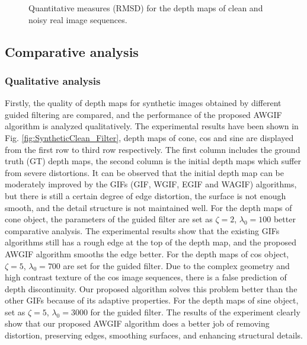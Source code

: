 \documentclass[a4paper,fleqn]{cas-dc}
\begin{document}
\begin{figure*}[htp]
	\centering
{}
	\caption{Quantitative measures (RMSD) for the depth maps of clean and noisy real image sequences.}
	\label{fig:QM_real}
	\vspace*{-0.4cm}
\end{figure*}

\subsection{Comparative analysis}\label{Comparative}
\subsubsection{Qualitative analysis}\label{Qualitative}
Firstly, the quality of depth maps for synthetic images obtained by different guided filtering are compared, and the performance of the proposed AWGIF algorithm is analyzed qualitatively. The experimental results have been shown in Fig. \ref{fig:SyntheticClean_Filter}, depth maps of cone, cos and sine are displayed from the first row to third row respectively. The first column includes the ground truth (GT) depth maps, the second column is the initial depth maps which suffer from severe distortions. It can be observed that the initial depth map can be moderately improved by the GIFs (GIF, WGIF, EGIF and WAGIF) algorithms, but there is still a certain degree of edge distortion, the surface is not enough smooth, and the detail structure is not maintained well. For the depth maps of cone object, the parameters of the guided filter are set as $\zeta = 2$, $\lambda_0 = 100$ better comparative analysis. The experimental results show that the existing GIFs algorithms still has a rough edge at the top of the depth map, and the proposed AWGIF algorithm smooths the edge better. For the depth maps of cos object, $\zeta = 5$, $\lambda_0 = 700$ are set for the guided filter. Due to the complex geometry and high contrast texture of the cos image sequences, there is a false prediction of depth discontinuity. Our proposed algorithm solves this problem better than the other GIFs because of its adaptive properties. For the depth maps of sine object, set as $\zeta = 5$, $\lambda_0 = 3000$ for the guided filter. The results of the experiment clearly show that our proposed AWGIF algorithm does a better job of removing distortion, preserving edges, smoothing surfaces, and enhancing structural details.
\end{document}
